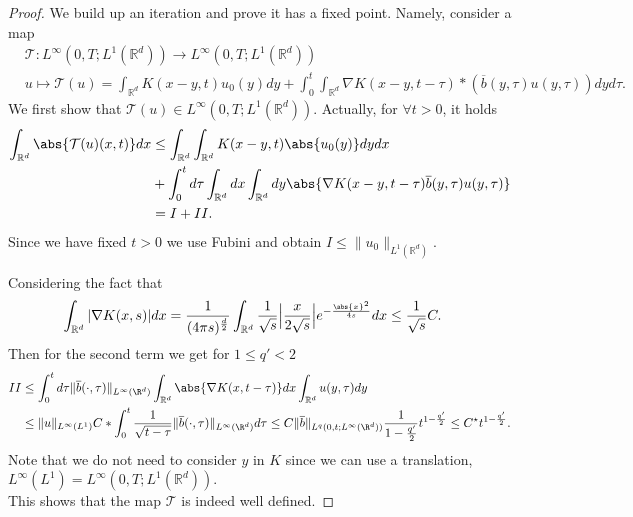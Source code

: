 \begin{proof}
 We build up an iteration and prove it has a fixed point. Namely, consider a map 
 \begin{align*}
   &\mathcal{T} : L^{\infty}(0,T;L^1(\mathbb{R}^{d} )) \to L^{\infty}(0,T;L^1(\mathbb{R}^{d} ))\\
   &u \mapsto \mathcal{T}(u) = \int_{\mathbb{R}^{d} }K(x-y,t)u_{0}(y) dy  + \int_{0}^{t} \int_{\mathbb{R}^{d} } \nabla K(x-y,t-\tau ) * (\overline{b}(y,\tau )u(y,\tau ) ) dy d\tau 
 .\end{align*}
We first show that $\mathcal{T}(u) \in  L^{\infty}(0,T;L^{1}(\mathbb{R}^{d} ) ) $. Actually, for $\forall  t >0$, it holds
 \begin{align*}
   \int_{\mathbb{R}^{d} }\abs{\mathcal{T}(u)(x,t)} dx &\le \int_{\mathbb{R}^{d} } \int_{\mathbb{R}^{d} } K(x-y,t)\abs{u_0(y)}dy dx \\
                                                      &+ \int_0^{t}  d\tau \int_{\mathbb{R}^{d} }dx \int_{\mathbb{R}^{d} } dy \abs{\nabla K(x-y,t-\tau )\overline{b} (y,\tau )u(y,\tau )}\\
                                                      &= I + II
 .\end{align*}
 Since we have fixed $t >0$ we use Fubini and obtain $ I \le \|u_{0}\|_{L^{1}(\mathbb{R}^{d} ) }$. 
  
  Considering the fact that
  \begin{align*}
    \int_{\mathbb{R}^{d} }|\nabla K(x,s)| dx  &= \frac{1}{(4 \pi s)^{\frac{d}{2}} } \int_{\mathbb{R}^{d} } \frac{1}{\sqrt{s} }\Big|\frac{x}{2 \sqrt{s} }\Big| e^{-\frac{\abs{x}^2}{4s}} dx \le  \frac{1}{\sqrt{s} }C
  .\end{align*}
  Then for the second term we get for $1\leq q'<2$ 
  \begin{align*}
    II &\le \int_{0}^{t}  d\tau  \|\overline{b} (\cdot,\tau)\|_{L^{\infty}(\R^d) } \int_{\mathbb{R}^{d} } \abs{\nabla K(x,t-\tau )}dx \int_{\mathbb{R}^{d} }u(y,\tau )dy\\
       &\le  \|u\|_{L^{\infty}(L^1) } C*\int_0^{t}  \frac{1}{\sqrt{t-\tau} }\|\overline{b} (\cdot,\tau)\|_{L^{\infty}(\R^d) } d\tau \leq  C\|\overline{b} \|_{L^q(0,t;L^{\infty}(\R^d)) }\frac{1}{1-\frac{q'}{2}}t^{1-\frac{q'}{2}}\leq C^\star t^{1-\frac{q'}{2}}
  .\end{align*}
  Note that we do not need to consider $y$ in $K$ since we can use a translation, $L^{\infty}(L^{1} ) = L^{\infty}(0,T;L^{1}(\mathbb{R}^{d} ) )  $. \\[1ex]
  This shows that the map $\mathcal{T}$ is indeed well defined.
  

\end{proof}
